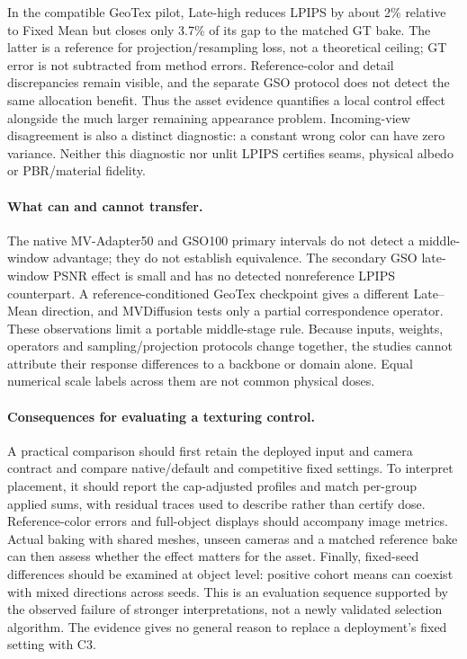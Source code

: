 \documentclass[times,twocolumn,final]{elsarticle}
\begin{document}
In the compatible GeoTex pilot, Late-high reduces LPIPS by about 2\% relative to Fixed Mean but closes only 3.7\% of its gap to the matched GT bake. The latter is a reference for projection/resampling loss, not a theoretical ceiling; GT error is not subtracted from method errors. Reference-color and detail discrepancies remain visible, and the separate GSO protocol does not detect the same allocation benefit. Thus the asset evidence quantifies a local control effect alongside the much larger remaining appearance problem. Incoming-view disagreement is also a distinct diagnostic: a constant wrong color can have zero variance. Neither this diagnostic nor unlit LPIPS certifies seams, physical albedo or PBR/material fidelity.

\paragraph{What can and cannot transfer.}
The native MV-Adapter50 and GSO100 primary intervals do not detect a middle-window advantage; they do not establish equivalence. The secondary GSO late-window PSNR effect is small and has no detected nonreference LPIPS counterpart. A reference-conditioned GeoTex checkpoint gives a different Late--Mean direction, and MVDiffusion tests only a partial correspondence operator. These observations limit a portable middle-stage rule. Because inputs, weights, operators and sampling/projection protocols change together, the studies cannot attribute their response differences to a backbone or domain alone. Equal numerical scale labels across them are not common physical doses.

\paragraph{Consequences for evaluating a texturing control.}
A practical comparison should first retain the deployed input and camera contract and compare native/default and competitive fixed settings. To interpret placement, it should report the cap-adjusted profiles and match per-group applied sums, with residual traces used to describe rather than certify dose. Reference-color errors and full-object displays should accompany image metrics. Actual baking with shared meshes, unseen cameras and a matched reference bake can then assess whether the effect matters for the asset. Finally, fixed-seed differences should be examined at object level: positive cohort means can coexist with mixed directions across seeds. This is an evaluation sequence supported by the observed failure of stronger interpretations, not a newly validated selection algorithm. The evidence gives no general reason to replace a deployment's fixed setting with C3.
\end{document}
